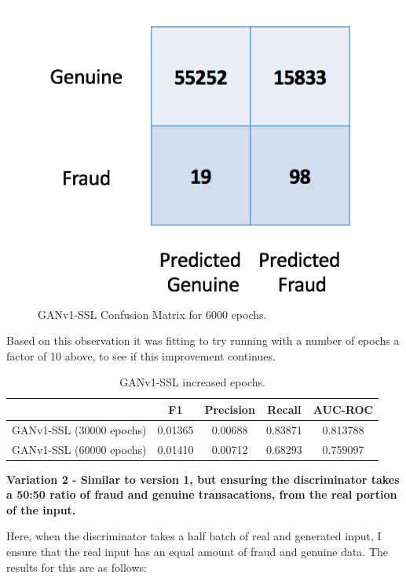 \documentclass[12pt,a4paper,twoside]{report}
\begin{document}
\begin{figure}[H]
\centering
\includegraphics[scale=0.6]{ganv1-ssl-cm-6000}
\caption{GANv1-SSL Confusion Matrix for 6000 epochs.}
\label{fig:ganv1-ssl-cm-6000}
\end{figure}

Based on this observation it was fitting to try running with a number of epochs a factor of 10 above, to see if this improvement continues. 

\begin{table}[H]  
  \centering
  \begin{tabular}{ccccc}
    \toprule
           		& F1 & Precision & Recall & AUC-ROC \\ \midrule
    GANv1-SSL (30000 epochs) & 0.01365  &  0.00688 & 0.83871  & 0.813788 \\
    GANv1-SSL (60000 epochs) & 0.01410   &   0.00712 & 0.68293 & 0.759097  \\
   
   \bottomrule
 \end{tabular}
 \caption{GANv1-SSL increased epochs.}
\label{table:ganv1-ssl-original-2}
\end{table}

\textbf{Variation 2 - Similar to version 1, but ensuring the discriminator takes a 50:50 ratio of fraud and genuine transacations, from the real portion of the input.}

Here, when the discriminator takes a half batch of real and generated input, I ensure that the real input has an equal amount of fraud and genuine data. The results for this are as follows:
\end{document}
